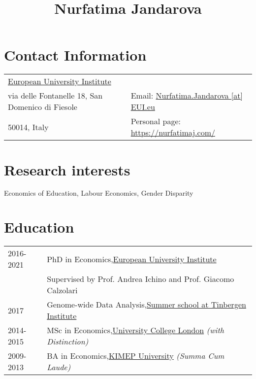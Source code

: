 \documentclass{article}
\title{Nurfatima Jandarova}
\date{}
\begin{document}
    \maketitle


    \section*{Contact Information}
    \begin{table}[H]
      \begin{tabular}{ll}\href{https://www.eui.eu/}{European University Institute}&\\
        via delle Fontanelle 18, San Domenico di Fiesole&
        Email: \href{mailto:Nurfatima.Jandarova [at] EUI.eu}{Nurfatima.Jandarova [at] EUI.eu} \\
        50014, Italy& Personal page: \href{https://nurfatimaj.com/}{https://nurfatimaj.com/}
      \end{tabular}
    \end{table}

    \section*{Research interests}Economics of Education, Labour Economics, Gender Disparity

    \section*{Education}\begin{table}[H]
        \begin{tabular}{p{2cm}p{14cm}}
            2016-2021 & PhD in Economics,\href{https://www.eui.eu}{European University Institute}\\ & Supervised by Prof. Andrea Ichino and Prof. Giacomo Calzolari\\
            2017 & Genome-wide Data Analysis,\href{https://www.tinbergen.nl/home}{Summer school at Tinbergen Institute}\\
            2014-2015 & MSc in Economics,\href{https://www.ucl.ac.uk}{University College London}\textit{ (with Distinction) }\\
            2009-2013 & BA in Economics,\href{https://www.kimep.kz/en}{KIMEP University}\textit{ (Summa Cum Laude) }\\
        \end{tabular}
      \end{table}
\end{document}
